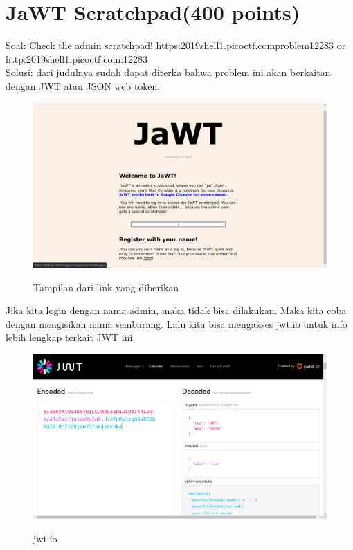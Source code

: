 \documentclass[a4paper,12pt]{article}
\begin{document}
\section{\textbf{JaWT Scratchpad(400 points)}}
Soal: Check the admin scratchpad! https:\/\/2019shell1.picoctf.com\/problem\/12283\/ or\\ http:\/\/2019shell1.picoctf.com:12283\\
Solusi: dari judulnya sudah dapat diterka bahwa problem ini akan berkaitan dengan JWT atau JSON web token.
\begin{figure}[H]
 \centering
\includegraphics[width=1\textwidth]{jwtscratch1.png}\\
\caption{Tampilan dari link yang diberikan}
\end{figure}
Jika kita login dengan nama admin, maka tidak bisa dilakukan. Maka kita coba dengan mengisikan nama sembarang. Lalu kita bisa mengakses jwt.io untuk info lebih lengkap terkait JWT ini.
\begin{figure}[H]
 \centering
\includegraphics[width=1\textwidth]{jwtscratch2.png}\\
\caption{jwt.io}
\end{figure}
\end{document}
